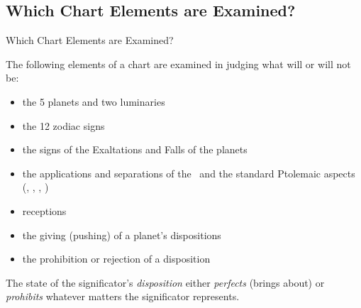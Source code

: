 \subsection{Which Chart Elements are Examined?}
\begin{frame}[t]{Which Chart Elements are Examined?}

The following elements of a chart are examined in judging what will or will not be:
\begin{itemize}
\item the 5 planets and two luminaries
\item the 12 zodiac signs
\item the signs of  the Exaltations and Falls of the planets
\item the applications and separations of the \Conjunction\ and the standard Ptolemaic aspects (\Sextile, \Square, \Trine, \Opposition)
\item receptions
\item the giving (pushing) of a planet's dispositions
\item the prohibition or rejection of a disposition
\end{itemize}
\vspace{0.5cm}

The state of the significator's \textsl{disposition} either \textsl{perfects} (brings about) or \textsl{prohibits} whatever matters the significator represents.
\end{frame}
